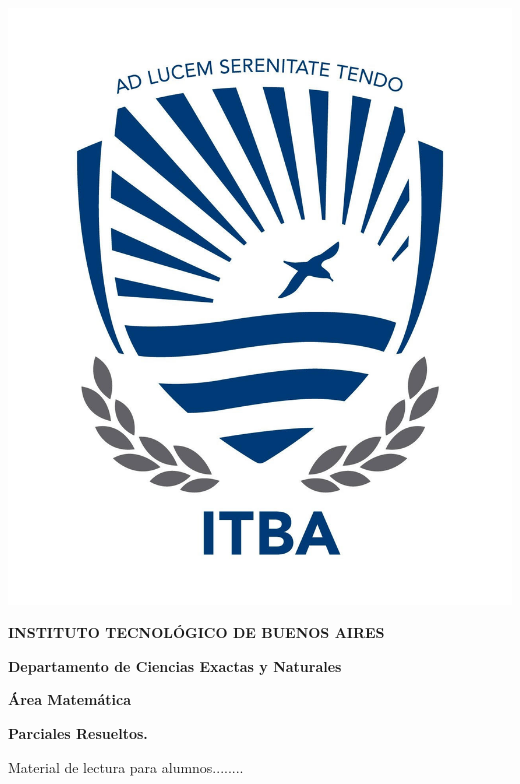 \documentclass[10pt, a4paper]{report}
\theoremstyle{definition} %
\begin{document}
    \begin{center}

        \thispagestyle{empty}  %

        \includegraphics[scale=0.2]{logoitba2.png}
        \medskip
        
        \textbf{\large{INSTITUTO  TECNOL\'OGICO DE BUENOS AIRES}\normalsize}
        
        \smallskip
        
        \textbf{\large  Departamento de Ciencias Exactas y Naturales}
        
        \smallskip
        \textbf{\large \'Area  Matem\'atica}
      
        \vspace{2 cm}
        
        \textbf{\Large \noindent \textbf{Parciales Resueltos.}}
             
        \vspace{1.5cm}
        
        \large  Material de lectura para alumnos........  \normalsize
    \end{center}
    
\end{document}
